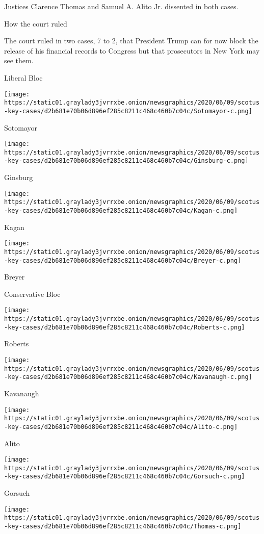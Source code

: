 Justices Clarence Thomas and Samuel A. Alito Jr. dissented in both
cases.

How the court ruled

The court ruled in two cases, 7 to 2, that President Trump can for now
block the release of his financial records to Congress but that
prosecutors in New York may see them.

Liberal Bloc

\texttt{[image: https://static01.graylady3jvrrxbe.onion/newsgraphics/2020/06/09/scotus-key-cases/d2b681e70b06d896ef285c8211c468c460b7c04c/Sotomayor-c.png]}

Sotomayor

\texttt{[image: https://static01.graylady3jvrrxbe.onion/newsgraphics/2020/06/09/scotus-key-cases/d2b681e70b06d896ef285c8211c468c460b7c04c/Ginsburg-c.png]}

Ginsburg

\texttt{[image: https://static01.graylady3jvrrxbe.onion/newsgraphics/2020/06/09/scotus-key-cases/d2b681e70b06d896ef285c8211c468c460b7c04c/Kagan-c.png]}

Kagan

\texttt{[image: https://static01.graylady3jvrrxbe.onion/newsgraphics/2020/06/09/scotus-key-cases/d2b681e70b06d896ef285c8211c468c460b7c04c/Breyer-c.png]}

Breyer

Conservative Bloc

\texttt{[image: https://static01.graylady3jvrrxbe.onion/newsgraphics/2020/06/09/scotus-key-cases/d2b681e70b06d896ef285c8211c468c460b7c04c/Roberts-c.png]}

Roberts

\texttt{[image: https://static01.graylady3jvrrxbe.onion/newsgraphics/2020/06/09/scotus-key-cases/d2b681e70b06d896ef285c8211c468c460b7c04c/Kavanaugh-c.png]}

Kavanaugh

\texttt{[image: https://static01.graylady3jvrrxbe.onion/newsgraphics/2020/06/09/scotus-key-cases/d2b681e70b06d896ef285c8211c468c460b7c04c/Alito-c.png]}

Alito

\texttt{[image: https://static01.graylady3jvrrxbe.onion/newsgraphics/2020/06/09/scotus-key-cases/d2b681e70b06d896ef285c8211c468c460b7c04c/Gorsuch-c.png]}

Gorsuch

\texttt{[image: https://static01.graylady3jvrrxbe.onion/newsgraphics/2020/06/09/scotus-key-cases/d2b681e70b06d896ef285c8211c468c460b7c04c/Thomas-c.png]}

